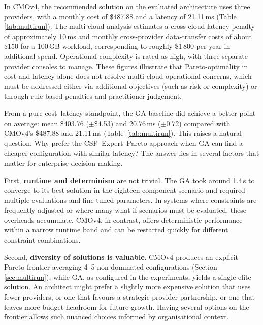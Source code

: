 \documentclass[journal]{IEEEtran}
\newcommand{\cmofour}{CMOv4\xspace}
\begin{document}
In \cmofour, the recommended solution on the evaluated architecture uses three
providers, with a monthly cost of \$487.88 and a latency of 21.11\,ms (Table
\ref{tab:multirun}). The multi-cloud analysis estimates a cross-cloud latency
penalty of approximately 10\,ms and monthly cross-provider data-transfer costs
of about \$150 for a 100\,GB workload, corresponding to roughly \$1\,800 per
year in additional spend. Operational complexity is rated as high, with three
separate provider consoles to manage. These figures illustrate that
Pareto-optimality in cost and latency alone does not resolve multi-cloud
operational concerns, which must be addressed either via additional
objectives (such as risk or complexity) or through rule-based penalties and
practitioner judgement.

From a pure cost--latency standpoint, the GA baseline did achieve a better
point on average: mean \$403.76 ($\pm$\$4.53) and 20.76\,ms ($\pm$0.72)
compared with \cmofour's \$487.88 and 21.11\,ms (Table~\ref{tab:multirun}).
This raises a natural question. Why prefer the CSP--Expert--Pareto approach when
GA can find a cheaper configuration with similar latency? The answer lies in
several factors that matter for enterprise decision making.

First, \textbf{runtime and determinism} are not trivial. The GA took around
1.4\,s to converge to its best solution in the eighteen-component scenario and
required multiple evaluations and fine-tuned parameters. In systems where
constraints are frequently adjusted or where many what-if scenarios must be
evaluated, these overheads accumulate. \cmofour, in contrast, offers
deterministic performance within a narrow runtime band and can be restarted
quickly for different constraint combinations.

Second, \textbf{diversity of solutions is valuable}. \cmofour produces an
explicit Pareto frontier averaging 4--5 non-dominated configurations (Section
\ref{sec:multirun}), while GA, as configured in the experiments, yields a
single elite solution. An architect might prefer a slightly more expensive
solution that uses fewer providers, or one that favours a strategic provider
partnership, or one that leaves more budget headroom for future growth.
Having several options on the frontier allows such nuanced choices informed
by organisational context.
\end{document}
